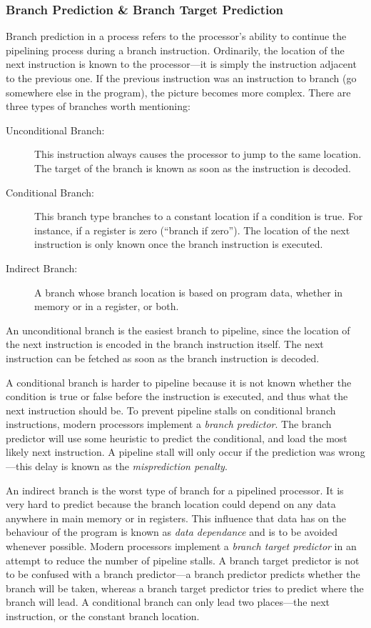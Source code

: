 			\subsubsection{Branch Prediction \& Branch Target Prediction}
			Branch prediction in a process refers to the processor's ability to continue the pipelining process during a branch instruction. Ordinarily, the location of the next instruction is known to the processor---it is simply the instruction adjacent to the previous one. If the previous instruction was an instruction to branch (go somewhere else in the program), the picture becomes more complex. There are three types of branches worth mentioning:
			
			\begin{description}
				\item[Unconditional Branch:] This instruction always causes the processor to jump to the same location. The target of the branch is known as soon as the instruction is decoded.
				\item[Conditional Branch:] This branch type branches to a constant location if a condition is true. For instance, if a register is zero (``branch if zero''). The location of the next instruction is only known once the branch instruction is executed.
				\item[Indirect Branch:] A branch whose branch location is based on program data, whether in memory or in a register, or both. 
			\end{description}
			
			An unconditional branch is the easiest branch to pipeline, since the location of the next instruction is encoded in the branch instruction itself. The next instruction can be fetched as soon as the branch instruction is decoded. 
			
			A conditional branch is harder to pipeline because it is not known whether the condition is true or false before the instruction is executed, and thus what the next instruction should be. To prevent pipeline stalls on conditional branch instructions, modern processors implement a \emph{branch predictor}. The branch predictor will use some heuristic to predict the conditional, and load the most likely next instruction. A pipeline stall will only occur if the prediction was wrong---this delay is known as the \emph{misprediction penalty}.
			
			An indirect branch is the worst type of branch for a pipelined processor. It is very hard to predict because the branch location could depend on any data anywhere in main memory or in registers. This influence that data has on the behaviour of the program is known as \emph{data dependance} and is to be avoided whenever possible. Modern processors implement a \emph{branch target predictor} in an attempt to reduce the number of pipeline stalls. A branch target predictor is not to be confused with a branch predictor---a branch predictor predicts whether the branch will be taken, whereas a branch target predictor tries to predict where the branch will lead. A conditional branch can only lead two places---the next instruction, or the constant branch location.
			
